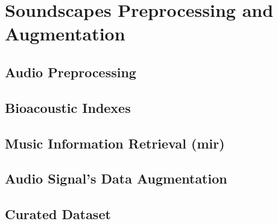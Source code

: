 




\chapter{Soundscapes Preprocessing and Augmentation}
\label{chap:prepro}

\section{Audio Preprocessing}
\label{sec:audio-prepro}


\section{Bioacoustic Indexes}
\label{sec:bio-index}

\section{Music Information Retrieval (\acrshort{mir})}
\label{sec:mir}

\section{Audio Signal's Data Augmentation}
\label{sec:data-aug}

\section{Curated Dataset}
\label{sec:cura-data}

